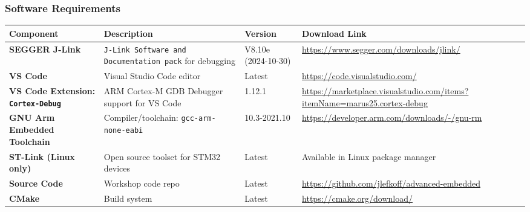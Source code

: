 \documentclass{beamer}
\begin{document}
\begin{frame}
    \frametitle{Software Requirements}
    \footnotesize
    \vspace{-0.5cm}
    \begin{table}[]
        \begin{tabular}{|p{2cm}|p{3cm}|p{1cm}|p{3.5cm}|}
            \hline
            \textbf{Component} & \textbf{Description} & \textbf{Version} & \textbf{Download Link} \\ \hline
            \textbf{SEGGER J-Link} & \texttt{J-Link Software and Documentation pack} for debugging & V8.10e (2024-10-30) & \url{https://www.segger.com/downloads/jlink/} \\ \hline
            \textbf{VS Code} & Visual Studio Code editor & Latest & \url{https://code.visualstudio.com/} \\ \hline
            \textbf{VS Code Extension: \texttt{Cortex-Debug}} & ARM Cortex-M GDB Debugger support for VS Code & 1.12.1 & \url{https://marketplace.visualstudio.com/items?itemName=marus25.cortex-debug} \\ \hline
            \textbf{GNU Arm Embedded Toolchain} & Compiler/toolchain: \texttt{gcc-arm-none-eabi} & 10.3-2021.10 & \url{https://developer.arm.com/downloads/-/gnu-rm} \\ \hline
            \textbf{ST-Link (Linux only)} & Open source toolset for STM32 devices & Latest & Available in Linux package manager \\ \hline
            \textbf{Source Code} & Workshop code repo & Latest & \url{https://github.com/jlefkoff/advanced-embedded} \\ \hline
            \textbf{CMake} & Build system & Latest & \url{https://cmake.org/download/} \\ \hline
        \end{tabular}
    \end{table}
\end{frame}
\end{document}
